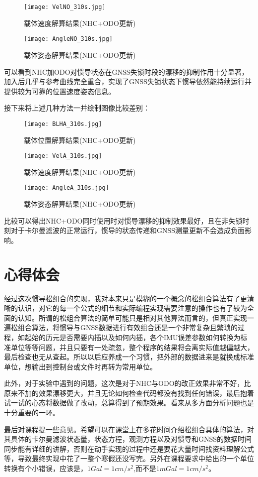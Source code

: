 \documentclass[codepkg=listings,theme=fancy]{course-report}
\begin{document}
\begin{figure}[H]
\texttt{[image: VelNO\_310s.jpg]}
\caption{载体速度解算结果(NHC+ODO更新)}
\end{figure}

\begin{figure}[H]
\texttt{[image: AngleNO\_310s.jpg]}
\caption{载体姿态解算结果(NHC+ODO更新)}
\end{figure}

可以看到NHC加ODO对惯导状态在GNSS失锁时段的漂移的抑制作用十分显著，加入后几乎与参考曲线完全重合，实现了GNSS失锁状态下惯导依然能持续运行并提供较为可靠的位置速度姿态信息。

接下来将上述几种方法一并绘制图像比较差别：
\begin{figure}[H]
\texttt{[image: BLHA\_310s.jpg]}
\caption{载体位置解算结果(NHC+ODO更新)}
\end{figure}

\begin{figure}[H]
\texttt{[image: VelA\_310s.jpg]}
\caption{载体速度解算结果(NHC+ODO更新)}
\end{figure}

\begin{figure}[H]
\texttt{[image: AngleA\_310s.jpg]}
\caption{载体姿态解算结果(NHC+ODO更新)}
\end{figure}

比较可以得出NHC+ODO同时使用时对惯导漂移的抑制效果最好，且在非失锁时刻对于卡尔曼滤波的正常运行，惯导的状态传递和GNSS测量更新不会造成负面影响。


\chapter{心得体会}
经过这次惯导松组合的实现，我对本来只是模糊的一个概念的松组合算法有了更清晰的认识，对它的每一个公式的细节和实际编程实现需要注意的操作也有了较为全面的认知。所谓的松组合算法的简单可能只是相对其他算法而言的，但真正实现一遍松组合算法，将惯导与GNSS数据进行有效组合还是一个非常复杂且繁琐的过程，如起始的历元是否需要内插以及如何内插，各个IMU误差参数如何转换为标准单位等等问题，并且只要有一处疏忽，整个程序的结果将会离实际值越偏越大，最后检查也无从查起。所以以后应养成一个习惯，把外部的数据进来是就换成标准单位，想输出到控制台或文件时再转为常用单位。

此外，对于实验中遇到的问题，这次是对于NHC与ODO的改正效果非常不好，比原来不加的效果漂移更大，并且无论如何检查代码都没有找到任何错误，最后抱着试一试的心态将数据做了改动，总算得到了预期效果。看来从多方面分析问题也是十分重要的一环。

最后对课程提一些意见。希望可以在课堂上在多花时间介绍松组合具体的算法，对其具体的卡尔曼滤波状态量，状态方程，观测方程以及对惯导和GNSS的数据时间同步能有详细的讲解，否则在动手实现的过程中还是要花大量时间找资料理解公式等，导致最终实现中花了一整个寒假还没写完。另外在课程要求中给出的一个单位转换有个小错误，应该是，$1Gal=1cm/s^2$,而不是$1mGal=1cm/s^2$。
\end{document}
